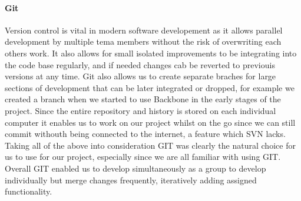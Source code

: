     \paragraph{Git\cite{git}} Version control is vital in modern software developement as it allows parallel development by multiple tema members without the risk of overwriting each others work. It also allows for small isolated improvements to be integrating into the code base regularly, and if needed changes cab be reverted to previouis versions at any time. Git also allows us to create separate braches for large sections of development that can be later integrated or dropped, for example we created a branch when we started to use Backbone in the early stages of the project.
    Since the entire repository and history is stored on each individual computer it enables us to work on our project whilst on the go since we can still commit withouth being connected to the internet, a feature which SVN lacks.
    Taking all of the above into consideration GIT was clearly the natural choice for us to use for our project, especially since we are all familiar with using GIT.
    Overall GIT enabled us to develop simultaneously as a group to develop individually but merge changes frequently, iteratively adding assigned functionality.
